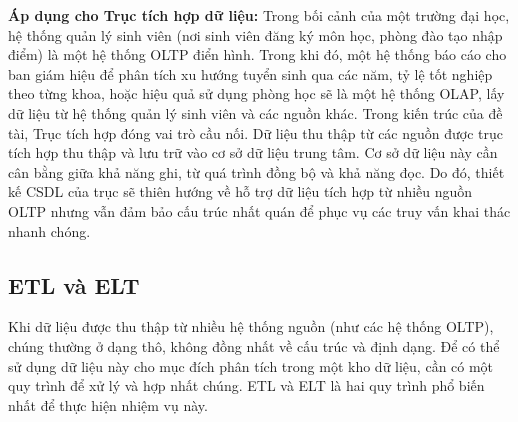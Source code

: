\textbf{Áp dụng cho Trục tích hợp dữ liệu:} 
Trong bối cảnh của một trường đại học, hệ thống quản lý sinh viên (nơi sinh viên đăng ký môn học, phòng đào tạo nhập điểm) là một hệ thống OLTP điển hình. Trong khi đó, một hệ thống báo cáo cho ban giám hiệu để phân tích xu hướng tuyển sinh qua các năm, tỷ lệ tốt nghiệp theo từng khoa, hoặc hiệu quả sử dụng phòng học sẽ là một hệ thống OLAP, lấy dữ liệu từ hệ thống quản lý sinh viên và các nguồn khác. Trong kiến trúc của đề tài, Trục tích hợp đóng vai trò cầu nối. Dữ liệu thu thập từ các nguồn được trục tích hợp thu thập và lưu trữ vào cơ sở dữ liệu trung tâm. Cơ sở dữ liệu này cần cân bằng giữa khả năng ghi, từ quá trình đồng bộ và khả năng đọc. Do đó, thiết kế CSDL của trục sẽ thiên hướng về hỗ trợ dữ liệu tích hợp từ nhiều nguồn OLTP nhưng vẫn đảm bảo cấu trúc nhất quán để phục vụ các truy vấn khai thác nhanh chóng.

\subsection{ETL và ELT}
Khi dữ liệu được thu thập từ nhiều hệ thống nguồn (như các hệ thống OLTP), chúng thường ở dạng thô, không đồng nhất về cấu trúc và định dạng. Để có thể sử dụng dữ liệu này cho mục đích phân tích trong một kho dữ liệu, cần có một quy trình để xử lý và hợp nhất chúng. ETL và ELT là hai quy trình phổ biến nhất để thực hiện nhiệm vụ này.

